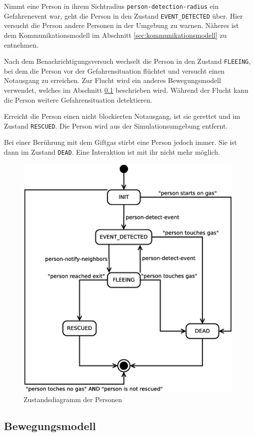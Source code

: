 Nimmt eine Person in ihrem Sichtradius \verb|person-detection-radius| ein Gefahrenevent war, geht die Person in den Zustand \verb|EVENT_DETECTED| über. Hier versucht die Person andere Personen in der Umgebung zu warnen. Näheres ist dem Kommunikationsmodell im Abschnitt \ref{sec:kommunikationsmodell} zu entnehmen.

Nach dem Benachrichtigungsversuch wechselt die Person in den Zustand \verb|FLEEING|, bei dem die Person vor der Gefahrensituation flüchtet und versucht einen Notausgang zu erreichen. Zur Flucht wird ein anderes Bewegungsmodell verwendet, welches im Abschnitt \ref{sec:bewegungsmodell} beschrieben wird. Während der Flucht kann die Person weitere Gefahrensituation detektieren.

Erreicht die Person einen nicht blockierten Notausgang, ist sie gerettet und im Zustand \verb|RESCUED|. Die Person wird aus der Simulationsumgebung entfernt.

Bei einer Berührung mit dem Giftgas stirbt eine Person jedoch immer. Sie ist dann im Zustand \verb|DEAD|. Eine Interaktion ist mit ihr nicht mehr möglich. 


\begin{figure}
\centering
\includegraphics[height=0.6\textwidth]{simulationsumgebung/person.eps}
\caption{Zustandsdiagramm der Personen}
\label{fig:person}
\end{figure}

\subsection{Bewegungsmodell}
\label{sec:bewegungsmodell}

